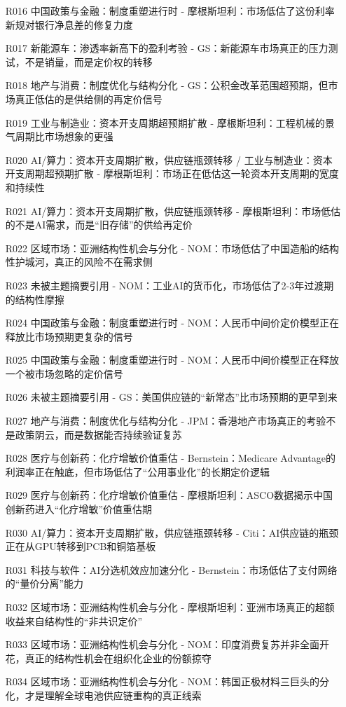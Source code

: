 \documentclass[11pt]{ctexart}
\begin{document}
\begin{itemize}
  \item [R016] 中国政策与金融：制度重塑进行时 - 摩根斯坦利：市场低估了这份利率新规对银行净息差的修复力度
  \item [R017] 新能源车：渗透率新高下的盈利考验 - GS：新能源车市场真正的压力测试，不是销量，而是定价权的转移
  \item [R018] 地产与消费：制度优化与结构分化 - GS：公积金改革范围超预期，但市场真正低估的是供给侧的再定价信号
  \item [R019] 工业与制造业：资本开支周期超预期扩散 - 摩根斯坦利：工程机械的景气周期比市场想象的更强
  \item [R020] AI/算力：资本开支周期扩散，供应链瓶颈转移 / 工业与制造业：资本开支周期超预期扩散 - 摩根斯坦利：市场正在低估这一轮资本开支周期的宽度和持续性
  \item [R021] AI/算力：资本开支周期扩散，供应链瓶颈转移 - 摩根斯坦利：市场低估的不是AI需求，而是“旧存储”的供给再定价
  \item [R022] 区域市场：亚洲结构性机会与分化 - NOM：市场低估了中国造船的结构性护城河，真正的风险不在需求侧
  \item [R023] 未被主题摘要引用 - NOM：工业AI的货币化，市场低估了2-3年过渡期的结构性摩擦
  \item [R024] 中国政策与金融：制度重塑进行时 - NOM：人民币中间价定价模型正在释放比市场预期更复杂的信号
  \item [R025] 中国政策与金融：制度重塑进行时 - NOM：人民币中间价模型正在释放一个被市场忽略的定价信号
  \item [R026] 未被主题摘要引用 - GS：美国供应链的“新常态”比市场预期的更早到来
  \item [R027] 地产与消费：制度优化与结构分化 - JPM：香港地产市场真正的考验不是政策阴云，而是数据能否持续验证复苏
  \item [R028] 医疗与创新药：化疗增敏价值重估 - Bernstein：Medicare Advantage的利润率正在触底，但市场低估了“公用事业化”的长期定价逻辑
  \item [R029] 医疗与创新药：化疗增敏价值重估 - 摩根斯坦利：ASCO数据揭示中国创新药进入“化疗增敏”价值重估期
  \item [R030] AI/算力：资本开支周期扩散，供应链瓶颈转移 - Citi：AI供应链的瓶颈正在从GPU转移到PCB和铜箔基板
  \item [R031] 科技与软件：AI分选机效应加速分化 - Bernstein：市场低估了支付网络的“量价分离”能力
  \item [R032] 区域市场：亚洲结构性机会与分化 - 摩根斯坦利：亚洲市场真正的超额收益来自结构性的“非共识定价”
  \item [R033] 区域市场：亚洲结构性机会与分化 - NOM：印度消费复苏并非全面开花，真正的结构性机会在组织化企业的份额掠夺
  \item [R034] 区域市场：亚洲结构性机会与分化 - NOM：韩国正极材料三巨头的分化，才是理解全球电池供应链重构的真正线索
\end{itemize}
\end{document}
